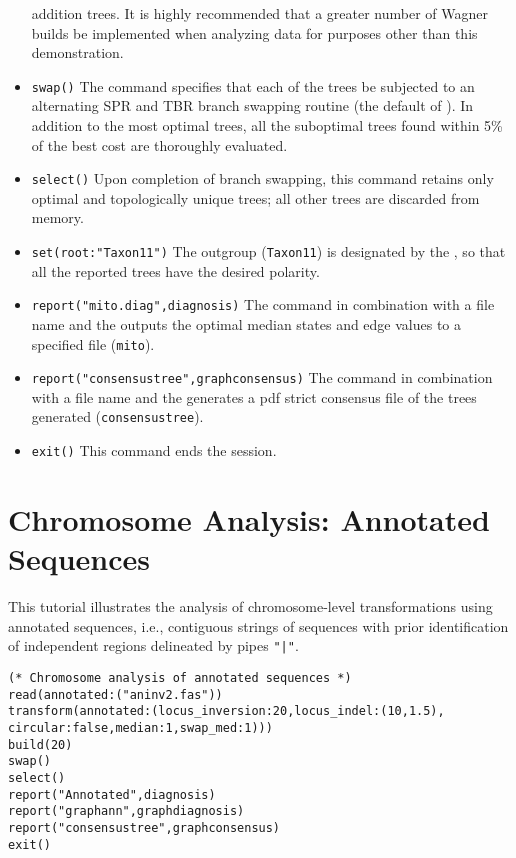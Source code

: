 \begin{itemize}
addition trees. It is highly recommended that a greater number of Wagner builds be implemented when analyzing 
data for purposes other than this demonstration.
\item \texttt{swap()} The  command specifies that each of the trees be subjected to an alternating 
SPR and TBR branch swapping routine (the default of \poy). In addition to the most optimal trees, all the suboptimal trees
found within 5\% of the best cost are thoroughly evaluated.
\item \texttt{select()} Upon completion of branch swapping, this command retains only optimal and topologically 
unique trees; all other trees are discarded from memory. 
\item \texttt{set(root:"Taxon11")} The outgroup (\texttt{Taxon11}) is designated by the , so that all the 
reported trees have the desired polarity.
\item \texttt{report("mito.diag",diagnosis)}  The  command in combination with a file name and the 
 outputs the optimal median states and edge values to a specified file (\texttt{mito}). 
\item \texttt{report("consensustree",graphconsensus)}  The  command in combination with a file 
name and the  generates a pdf strict consensus file of the trees generated 
(\texttt{consensustree}). 

\item \texttt{exit()} This command ends the \poy session.
\end{itemize}


\section{Chromosome Analysis: Annotated Sequences}{\label{tutorial9}}

This tutorial illustrates the analysis of chromosome-level transformations using 
annotated sequences, i.e., contiguous strings of sequences with prior 
identification of independent regions delineated by pipes  \texttt{"|"}. 

\begin{verbatim}
(* Chromosome analysis of annotated sequences *)
read(annotated:("aninv2.fas"))
transform(annotated:(locus_inversion:20,locus_indel:(10,1.5),
circular:false,median:1,swap_med:1)))
build(20)
swap()
select()
report("Annotated",diagnosis)
report("graphann",graphdiagnosis)
report("consensustree",graphconsensus)
exit()
\end{verbatim}

